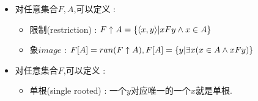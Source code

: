 {{{\begin{itemize}
{\begin{itemize}
{                  证明 : \begin{math}
                    \forall\dependent{x,y}, \dependent{x,y} \in (R_1 \circ R_2) \circ R_3 \\
                    \Leftrightarrow \exists z (x R_3 z \land z(R_1 \circ R_2)y) \\
                    \Leftrightarrow \exists z (x R_3 z \land \exists t(z R_2 t \land t R_1 y)) \\
                    \Leftrightarrow \exists z \exists t(x R_3 z \land (z R_2 t \land t R_1 y)) \\
                    \Leftrightarrow \exists t \exists z(x R_3 z \land z R_2 t \land t R_1 y) \\
                    \Leftrightarrow \exists t \exists z (x R_3 z \land z R_2 t \land t R_1 y) \\
                    \Leftrightarrow \exists t(\exists z(x R_3 z \land z R_2 t) \land t R_1 y) \\
                    \Leftrightarrow \exists t(x(R_2 \circ R_3)t \land t R_1 y) \\
                    \Leftrightarrow x R_1 \circ (R_2 \circ R_3) y \\
                    \Leftrightarrow \dependent{x,y} \in R_1 \circ (R_2 \circ R_3) \\
                    \therefore (R_1 \circ R_2) \circ R_3 = R_1 \circ (R_2 \circ R_3)
                  \end{math}

                  \qed
                  }
          \end{itemize}
          }
    \item {
          对任意集合$F,A$,可以定义 :

          \begin{itemize}
            \item 限制(restriction) : $F \uparrow A = \left\{ \langle x,y\rangle | xFy \land x \in A \right\}$
            \item 象$image$ : $F[A] = ran(F \uparrow A),F[A] = \left\{ y | \exists x (x \in A \land xFy) \right\}$
          \end{itemize}
          }
    \item {
          对任意集合$F$,可以定义 :

          \begin{itemize}
            \item {
                  单根(single rooted) : 一个$y$对应唯一的一个$x$就是单根.

}
\end{itemize}}
\end{itemize}}}}
